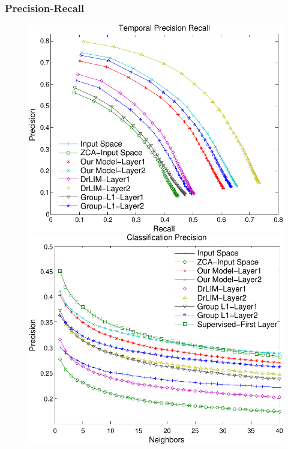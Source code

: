 \documentclass{beamer}
\begin{document}
\begin{frame}
\frametitle{Precision-Recall}
\begin{center} 
\begin{figure}
\includegraphics[scale=0.40]{./Figures/Project1/AUC_time-crop.pdf}
\includegraphics[scale=0.40]{./Figures/Project1/AUC_class-crop.pdf} 
\end{figure}
\end{center}  
\end{frame} 
\end{document}
